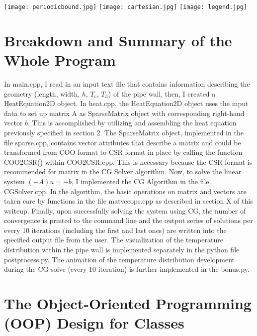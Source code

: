 \documentclass{article}
\begin{document}
\begin{center}

\texttt{[image: periodicbound.jpg]}
\texttt{[image: cartesian.jpg]}
\texttt{[image: legend.jpg]}
\end{center}

\section{Breakdown and Summary of the Whole Program}

In {\selectfont main.cpp}, I read in an input text file that contains information describing the geometry (length, width, $h$, $T_c$, $T_h$) of the pipe wall, then, I created a {\selectfont HeatEquation2D} object. In {\selectfont heat.cpp}, the {\selectfont HeatEquation2D} object uses the input data to set up matrix A as {\selectfont SparseMatrix} object with corresponding right-hand vector $b$. This is accomplished by utilizing and assembling the heat equation previously specified in section 2. The {\selectfont SparseMatrix} object, implemented in the file {\selectfont sparse.cpp}, contains vector attributes that describe a matrix and could be transformed from COO format to CSR format in place by calling the function COO2CSR() within {\selectfont COO2CSR.cpp}. This is necessary because the CSR format is recommended for matrix in the CG Solver algorithm. Now, to solve the linear system $(-A)u = -b$, I implemented the CG Algorithm in the file {\selectfont CGSolver.cpp}. In the algorithm, the basic operations on matrix and vectors are taken care by functions in the file {\selectfont matvecops.cpp} as described in section X of this writeup. Finally, upon successfully solving the system using CG, the number of convergence is printed to the command line and the output series of solutions per every 10 iterations (including the first and last ones) are written into the specified output file from the user. The visualization of the temperature distribution within the pipe wall is implemented separately in the python file {\selectfont postprocess.py}. The animation of the temperature distribution development during the CG solve (every 10 iteration) is further implemented in the {\selectfont bonus.py}. 

\section{The Object-Oriented Programming (OOP) Design for Classes}
\end{document}
